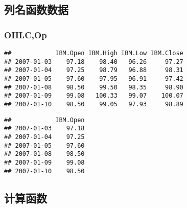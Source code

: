 \subsection{列名函数数据}
\subsubsection{OHLC,Op}
\begin{knitrout}
\color{fgcolor}\begin{kframe}
\begin{alltt}
\hlstd{(}
\end{alltt}
\begin{verbatim}
##            IBM.Open IBM.High IBM.Low IBM.Close
## 2007-01-03    97.18    98.40   96.26     97.27
## 2007-01-04    97.25    98.79   96.88     98.31
## 2007-01-05    97.60    97.95   96.91     97.42
## 2007-01-08    98.50    99.50   98.35     98.90
## 2007-01-09    99.08   100.33   99.07    100.07
## 2007-01-10    98.50    99.05   97.93     98.89
\end{verbatim}
\begin{alltt}
\hlstd{(}
\end{alltt}
\begin{verbatim}
##            IBM.Open
## 2007-01-03    97.18
## 2007-01-04    97.25
## 2007-01-05    97.60
## 2007-01-08    98.50
## 2007-01-09    99.08
## 2007-01-10    98.50
\end{verbatim}
\end{kframe}
\end{knitrout}
\subsection{计算函数}
